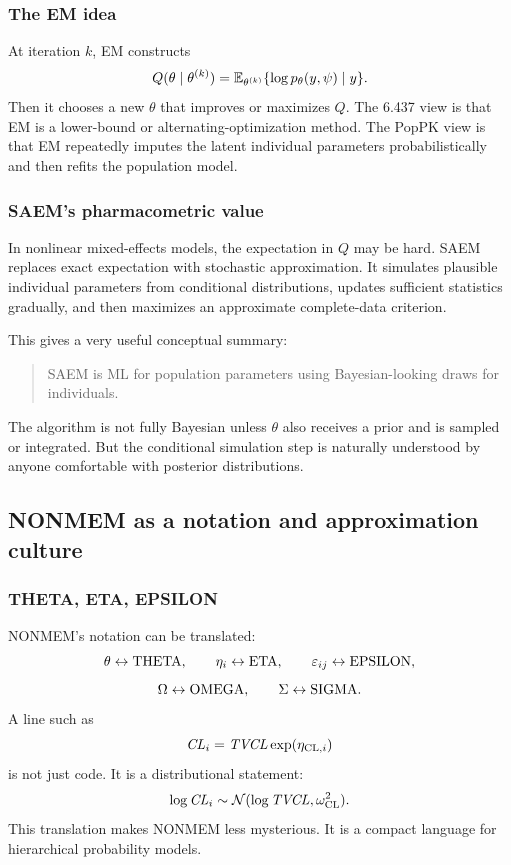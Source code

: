 \subsubsection*{The EM idea}

At iteration \(k\), EM constructs
\[
  Q(\theta\mid\theta^{(k)})
  =
  \mathbb{E}_{\theta^{(k)}}\{
    \log p_\theta(y,\psi)
    \mid y
  \}.
\]
Then it chooses a new \(\theta\) that improves or maximizes \(Q\).  The 6.437 view is that EM is a lower-bound or alternating-optimization method.  The PopPK view is that EM repeatedly imputes the latent individual parameters probabilistically and then refits the population model.

\subsubsection*{SAEM's pharmacometric value}

In nonlinear mixed-effects models, the expectation in \(Q\) may be hard.  SAEM replaces exact expectation with stochastic approximation.  It simulates plausible individual parameters from conditional distributions, updates sufficient statistics gradually, and then maximizes an approximate complete-data criterion.

This gives a very useful conceptual summary:
\begin{quote}
  SAEM is ML for population parameters using Bayesian-looking draws for individuals.
\end{quote}
The algorithm is not fully Bayesian unless \(\theta\) also receives a prior and is sampled or integrated.  But the conditional simulation step is naturally understood by anyone comfortable with posterior distributions.

\subsection{NONMEM as a notation and approximation culture}

\subsubsection*{THETA, ETA, EPSILON}

NONMEM's notation can be translated:
\[
  \theta \leftrightarrow \mathrm{THETA},
  \qquad
  \eta_i \leftrightarrow \mathrm{ETA},
  \qquad
  \varepsilon_{ij} \leftrightarrow \mathrm{EPSILON},
\]
\[
  \Omega \leftrightarrow \mathrm{OMEGA},
  \qquad
  \Sigma \leftrightarrow \mathrm{SIGMA}.
\]
A line such as
\[
  \pksym{CL}_i=\pksym{TVCL}\exp(\eta_{\pklab{CL},i})
\]
is not just code.  It is a distributional statement:
\[
  \log \pksym{CL}_i\sim\Normal(\log \pksym{TVCL},\omega_{\pklab{CL}}^2).
\]
This translation makes NONMEM less mysterious.  It is a compact language for hierarchical probability models.

